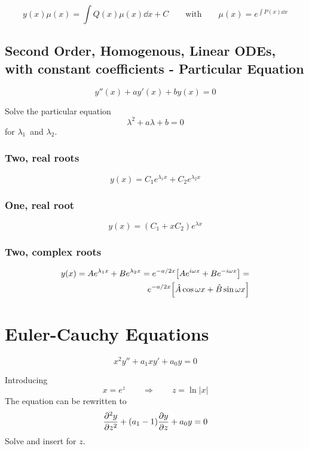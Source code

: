 \documentclass[10pt,a4paper]{article}
\renewcommand{\exp}{e^}
\begin{document}
\begin{multicols}{2}
\[
    y(x)\mu(x) = \int Q(x)\mu(x) \dd{x} + C \quad\quad\text{with}\quad\quad \mu(x) = \exp{\int P(x)\dd{x}}
\]





\subsection*{Second Order, Homogenous, Linear ODEs, with constant coefficients - Particular Equation}
\[
    y''(x) + ay'(x) + by(x) = 0
\]

Solve the particular equation
\[
    \lambda^2 + a\lambda + b = 0
\]
for $\lambda_1$ and $\lambda_2$.


\subsubsection*{Two, real roots}
\[
    y(x) = C_1\exp{\lambda_1 x} + C_2\exp{\lambda_2 x}
\]


\subsubsection*{One, real root}
\[
    y(x) = (C_1 + xC_2)\exp{\lambda x}
\]


\subsubsection*{Two, complex roots}
\begin{equation*}
\begin{split}
    y(x) = A\exp{\lambda_1 x} + B\exp{\lambda_2 x} = \exp{-a/2 x}\qty[A\exp{i\omega x} + B\exp{-i\omega x}] =\\
    \exp{-a/2 x}\qty[\hat{A}\cos{\omega x} + \hat{B}\sin{\omega x}]
\end{split}
\end{equation*}



\section*{Euler-Cauchy Equations}
\[
    x^2y'' + a_1x y' + a_0 y = 0
\]

Introducing
\[
    x = \exp{z} \quad\quad\Rightarrow\quad\quad z = \ln|x|
\]
The equation can be rewritten to
\[
    \pdv[2]{y}{z} + (a_1-1)\pdv{y}{z} + a_0 y = 0
\]
Solve and insert for $z$.



\newpage


\end{multicols}
\end{document}
